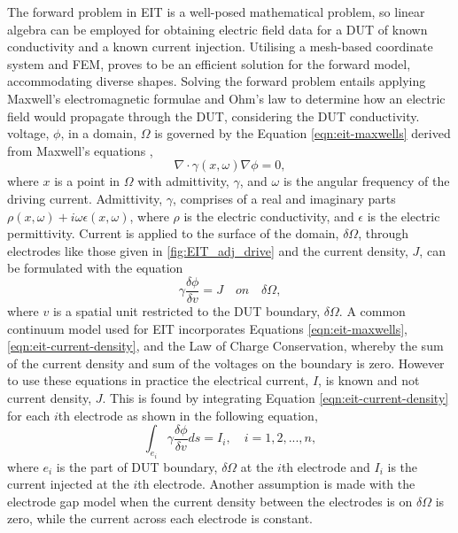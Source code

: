 The forward problem in EIT is a well-posed mathematical problem, so linear algebra can be employed for obtaining electric field data for a DUT of known conductivity and a known current injection. Utilising a mesh-based coordinate system and FEM, proves to be an efficient solution for the forward model, accommodating diverse shapes. Solving the forward problem entails applying Maxwell's electromagnetic formulae and Ohm's law to determine how an electric field would propagate through the DUT, considering the DUT conductivity. voltage, $\phi$, in a domain, $\Omega$ is governed by the Equation \ref{eqn:eit-maxwells} derived from Maxwell's equations \cite{Cheney1999},
\begin{equation}
	\nabla \cdot \gamma(x,\omega) \nabla \phi = 0,
	\label{eqn:eit-maxwells}
\end{equation}
where $x$ is a point in $\Omega$ with admittivity, $\gamma$, and $\omega$ is the angular frequency of the driving current. Admittivity, $\gamma$, comprises of a real and imaginary parts $\rho(x,\omega) + i\omega\epsilon(x,\omega)$, where $\rho$ is the electric conductivity, and $\epsilon$ is the electric permittivity. Current is applied to the surface of the domain, $\delta\Omega$, through electrodes like those given in \ref{fig:EIT_adj_drive} and the current density, $J$, can be formulated with the equation
\begin{equation}
	\gamma \frac{\delta \phi}{\delta v} = J \quad on \quad \delta\Omega,
	\label{eqn:eit-current-density}
\end{equation}
where $v$ is a spatial unit restricted to the DUT boundary, $\delta\Omega$. A common continuum model used for EIT incorporates Equations \ref{eqn:eit-maxwells}, \ref{eqn:eit-current-density}, and the Law of Charge Conservation, whereby the sum of the current density and sum of the voltages on the boundary is zero. However to use these equations in practice the electrical current, $I$, is known and not current density, $J$. This is found by integrating Equation \ref{eqn:eit-current-density} for each $i$th electrode as shown in the following equation,
\begin{equation}
	\int_{e_i} \gamma \frac{\delta\phi}{\delta v} ds = I_i, \quad i = 1, 2, ..., n,
	\label{eqn:eit-current}
\end{equation}
where $e_i$ is the part of DUT boundary, $\delta\Omega$ at the $i$th electrode and $I_i$ is the current injected at the $i$th electrode. Another assumption is made with the electrode gap model when the current density between the electrodes is on $\delta\Omega$ is zero, while the current across each electrode is constant.

